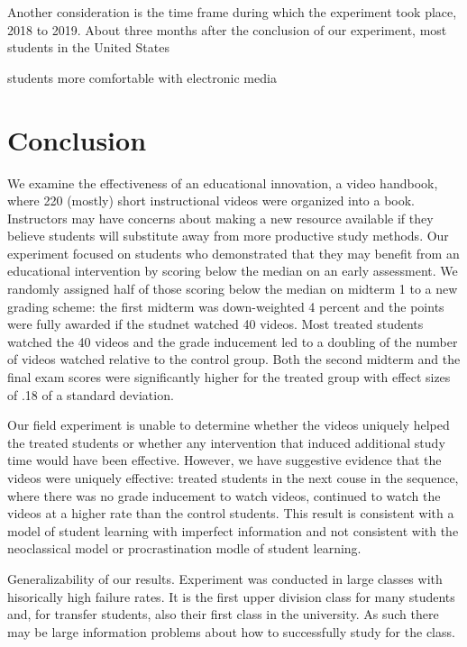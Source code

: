 \documentclass[12pt]{article}
\begin{document}
Another consideration is the time frame during which the experiment took place, 2018 to 2019. About three months after the conclusion of our experiment, most students in the United States

students more comfortable with electronic media


\section{Conclusion} \label{conclusion}

We examine the effectiveness of an educational innovation, a video handbook, where 220 (mostly) short instructional videos were organized into a book. Instructors may have concerns about making a new resource available if they believe students will substitute away from more productive study methods. Our experiment focused on students who demonstrated that they may benefit from an educational intervention by scoring below the median on an early assessment. We randomly assigned half of those scoring below the median on midterm 1 to a new grading scheme: the first midterm was down-weighted 4 percent and the points were fully awarded if the studnet watched 40 videos. Most treated students watched the 40 videos and the grade inducement led to a doubling of the number of videos watched relative to the control group. Both the second midterm and the final exam scores were significantly higher for the treated group with effect sizes of .18 of a standard deviation.

Our field experiment is unable to determine whether the videos uniquely helped the treated students or whether any intervention that induced additional study time would have been effective. However, we have suggestive evidence that the videos were uniquely effective: treated students in the next couse in the sequence, where there was no grade inducement to watch videos, continued to watch the videos at a higher rate than the control students. This result is consistent with a model of student learning with imperfect information and not consistent with the neoclassical model or procrastination modle of student learning.

Generalizability of our results. Experiment was conducted in large classes with hisorically high failure rates. It is the first upper division class for many students and, for transfer students, also their first class in the university. As such there may be large information problems about how to successfully study for the class.
\end{document}
